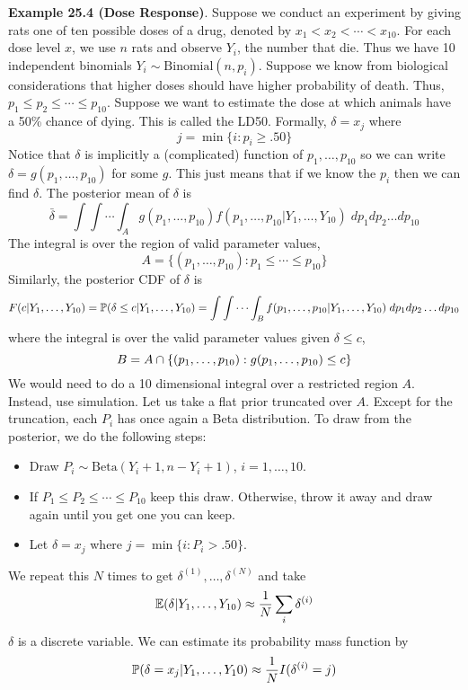 \textbf{Example 25.4 (Dose Response)}. Suppose we conduct an experiment
by giving rats one of ten possible doses of a drug, denoted by
\(x_{1} < x_{2} < \cdots < x_{10}\). For each dose level \(x\), we use \(n\)
rats and observe \(Y_{i}\), the number that die. Thus we have 10
independent binomials \(Y_{i} \sim \text{Binomial}(n, p_{i})\). Suppose we
know from biological considerations that higher doses should have higher
probability of death. Thus, \(p_{1} \leq p_{2} \leq \cdots \leq p_{10}\).
Suppose we want to estimate the dose at which animals have a 50\% chance
of dying. This is called the LD50. Formally, \(\delta = x_{j}\) where
\[
j = \min \{ i: p_{i} \geq .50 \}
\]
Notice that \(\delta\) is implicitly a (complicated) function of
\(p_{1}, \dots, p_{10}\) so we can write
\(\delta = g(p_{1}, \dots, p_{10})\) for some \(g\). This just means that
if we know the \(p_{i}\) then we can find \(\delta\). The posterior mean
of \(\delta\) is
\[
\bar{\delta} = \int \int \cdots \int_A g(p_{1}, \dots, p_{10}) f(p_{1}, \dots, p_{10} | Y_{1}, \dots, Y_{10} ) \; dp_{1} dp_{2} \dots dp_{10}
\]
The integral is over the region of valid parameter values,
\[
A = \{ (p_{1}, \dots, p_{10}) : p_{1} \leq \cdots \leq p_{10} \}
\]
Similarly, the posterior CDF of \(\delta\) is
\[
F(c | Y_{1}, \dots, Y_{10}) = \operatorname{\mathbb{P}}(\delta \leq c | Y_{1}, \dots, Y_{10}) = \int \int \cdots \int_B f(p_{1}, \dots, p_{10} | Y_{1}, \dots, Y_{10} ) \; dp_{1} dp_{2} \dots dp_{10}
\]
where the integral is over the valid parameter values given $
\delta \leq c$,
\[
B = A \cap \{ (p_{1}, \dots, p_{10}) : g(p_{1}, \dots, p_{10}) \leq c \}
\]
We would need to do a 10 dimensional integral over a restricted region
\(A\). Instead,  use simulation.
Let us take a flat prior truncated over \(A\). Except for the
truncation, each \(P_{i}\) has once again a Beta distribution. To draw
from the posterior, we do the following steps:
\begin{itemize}[tightlist]
\item
  Draw \(P_{i} \sim \text{Beta}(Y_{i} + 1, n - Y_{i} + 1)\),
  \(i = 1, \dots, 10\).
\item
  If \(P_{1} \leq P_{2} \leq \cdots \leq P_{10}\) keep this draw. Otherwise,
  throw it away and draw again until you get one you can keep.
\item
  Let \(\delta = x_{j}\) where \(j = \min \{ i : P_{i} > .50 \}\).
\end{itemize}
We repeat this \(N\) times to get \(\delta^{(1)}, \dots, \delta^{(N)}\)
and take
\[
\operatorname{\mathbb{E}}(\delta | Y_{1}, \dots, Y_{10}) \approx \frac{1}{N} \sum_{i} \delta^{(i)}
\]
\(\delta\) is a discrete variable. We can estimate its probability mass
function by
\[
\operatorname{\mathbb{P}}(\delta = x_{j} | Y_{1}, \dots, Y_{1}0) \approx \frac{1}{N} I(\delta^{(i)} = j)
\]

